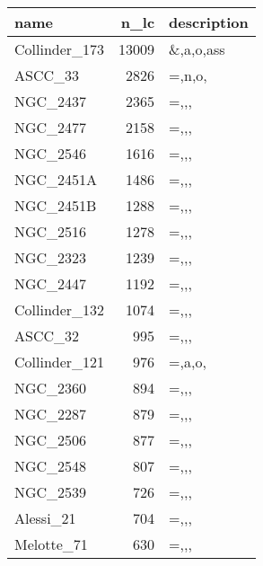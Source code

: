 \begin{tabular}{lrl}
\toprule
          name &   n\_lc & description \\
\midrule
 Collinder\_173 &  13009 &   \&,a,o,ass \\
       ASCC\_33 &   2826 &      =,n,o, \\
      NGC\_2437 &   2365 &        =,,, \\
      NGC\_2477 &   2158 &        =,,, \\
      NGC\_2546 &   1616 &        =,,, \\
     NGC\_2451A &   1486 &        =,,, \\
     NGC\_2451B &   1288 &        =,,, \\
      NGC\_2516 &   1278 &        =,,, \\
      NGC\_2323 &   1239 &        =,,, \\
      NGC\_2447 &   1192 &        =,,, \\
 Collinder\_132 &   1074 &        =,,, \\
       ASCC\_32 &    995 &        =,,, \\
 Collinder\_121 &    976 &      =,a,o, \\
      NGC\_2360 &    894 &        =,,, \\
      NGC\_2287 &    879 &        =,,, \\
      NGC\_2506 &    877 &        =,,, \\
      NGC\_2548 &    807 &        =,,, \\
      NGC\_2539 &    726 &        =,,, \\
     Alessi\_21 &    704 &        =,,, \\
    Melotte\_71 &    630 &        =,,, \\
\bottomrule
\end{tabular}
